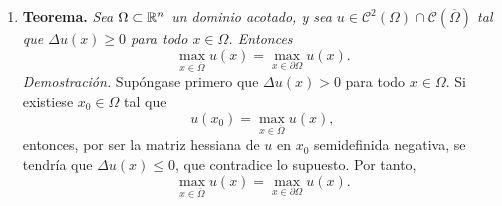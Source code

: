 \documentclass[a4paper, 12pt, extrafontsizes]{memoir}
\begin{document}
\begin{solution}
\hfill
\begin{enumerate}
    \item \textbf{Teorema.} \textit{Sea $\Omega \subset \mathbb R^n$ un dominio acotado, y sea $u \in \mathcal{C}^2(\Omega) \cap \mathcal{C}(\overline{\Omega})$ tal que $\Delta u(x) \geq 0$ para todo $x \in \Omega$. Entonces
    \[\max_{x \in \overline{\Omega}} u(x) = \max_{x \in \partial \Omega} u(x).\]
    Demostración.} Supóngase primero que $\Delta u(x) > 0$ para todo $x \in \Omega$. Si existiese $x_0 \in \Omega$ tal que
    \[u(x_0) = \max_{x \in \overline{\Omega}}u(x),\]
    entonces, por ser la matriz hessiana de $u$ en $x_0$ semidefinida negativa, se tendría que $\Delta u(x) \leq 0$, que contradice lo supuesto. Por tanto,
    \[\max_{x \in \overline{\Omega}} u(x) = \max_{x \in \partial\Omega} u(x).\]


\end{enumerate}
\end{solution}
\end{document}
